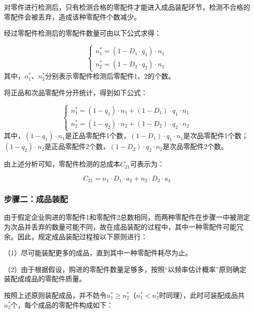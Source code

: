 \documentclass[withoutpreface,bwprint]{cumcmthesis} %
\begin{document}
对零件进行检测后，只有检测合格的零配件才能进入成品装配环节，检测不合格的零配件会被丢弃，造成该种零配件个数减少。

经过零配件检测后的零配件数量可由以下公式求得：

\begin{equation}
	\left\{\begin{array}{l}
		n _1^*=(1-D _1 \cdot q_1 ) \cdot n _1 \\
		n _2^*=(1-D_ 2 \cdot q_2) \cdot n_ 2
	\end{array}\right.
\end{equation}
其中，$n_1^*$、$n_2^*$分别表示零配件检测后零配件1、2的个数。

将正品和次品零配件分开统计，得到如下公式：

\begin{equation}
	\left\{\begin{array}{l}
		n _1^*=(1-q _1) \cdot n _1+(1-D _1) \cdot q _1 \cdot n _1 \\
		n _2^*=(1-q _2) \cdot n_ 2+(1-D_ 2) \cdot q _2 \cdot n_ 2
	\end{array}\right.
\end{equation}
其中，$(1-q _1) \cdot n _1$是正品零配件1个数，$(1-D _1) \cdot q _1 \cdot n _1$是次品零配件1个数；$(1-q _2) \cdot n_ 2$是正品零配件2个数，$(1-D_ 2) \cdot q _2 \cdot n_ 2$是次品零配件2个数。

由上述分析可知，零配件检测的总成本$C_{21}$可表示为：

\begin{equation}
	C_{21}=n_1\cdot D_1\cdot
	a_2+n_2 \cdot D_2 \cdot a_4 
	\label{C}
\end{equation}

\subsubsection*{步骤二：成品装配}

由于假定企业购进的零配件1和零配件2总数相同，而两种零配件在步骤一中被测定为次品并丢弃的数量可能不同，故在成品装配的过程中，其中一种零配件可能冗余。因此，规定成品装配过程按以下原则进行：

（1）尽可能装配更多的成品，直到其中一种零配件耗尽为止。

（2）由于根据假设，购进的零配件数量足够多，按照“以频率估计概率”原则确定装配成成品的零配件质量。

按照上述原则装配成品，并不妨令$n_1^* \geqslant n_2^*$（$n_1^* < n_2^*$时同理），此时可装配成品共$n_2^*$个，每个成品的零配件构成如下：
\end{document}
